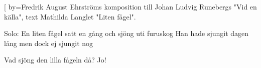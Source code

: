 	[
	by={Fredrik August Ehrströms komposition till Johan Ludvig Runebergs "Vid en källa", text Mathilda Langlet "Liten fågel".}				
	
\beginverse*
Solo:
En liten fågel
satt en gång
och sjöng uti furuskog
Han hade sjungit dagen lång
men dock ej sjungit nog
\endverse

\beginverse*
Vad sjöng den lilla fågeln då?
Jo!			
\endverse									
\endsong							
